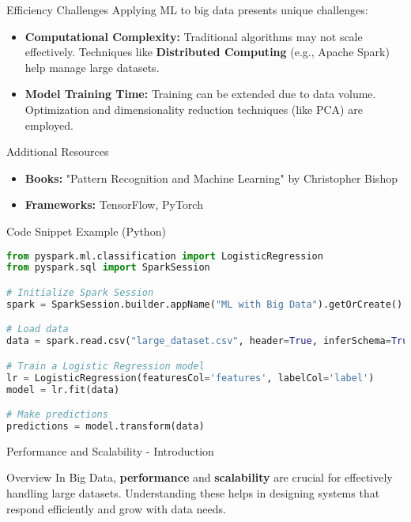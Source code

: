 \documentclass[aspectratio=169]{beamer}
\begin{document}
\begin{frame}[fragile]{Efficiency Challenges}
    Applying ML to big data presents unique challenges:
    \begin{itemize}
        \item \textbf{Computational Complexity:} Traditional algorithms may not scale effectively. Techniques like \textbf{Distributed Computing} (e.g., Apache Spark) help manage large datasets.
        \item \textbf{Model Training Time:} Training can be extended due to data volume. Optimization and dimensionality reduction techniques (like PCA) are employed.
    \end{itemize}
\end{frame}

\begin{frame}[fragile]{Additional Resources}
    \begin{itemize}
        \item \textbf{Books:} "Pattern Recognition and Machine Learning" by Christopher Bishop
        \item \textbf{Frameworks:} TensorFlow, PyTorch
    \end{itemize}
    
    \begin{block}{Code Snippet Example (Python)}
    \begin{lstlisting}[language=Python]
from pyspark.ml.classification import LogisticRegression
from pyspark.sql import SparkSession

# Initialize Spark Session
spark = SparkSession.builder.appName("ML with Big Data").getOrCreate()

# Load data
data = spark.read.csv("large_dataset.csv", header=True, inferSchema=True)

# Train a Logistic Regression model
lr = LogisticRegression(featuresCol='features', labelCol='label')
model = lr.fit(data)

# Make predictions
predictions = model.transform(data)
    \end{lstlisting}
    \end{block}
\end{frame}

\begin{frame}[fragile]{Performance and Scalability - Introduction}
  \begin{block}{Overview}
    In Big Data, \textbf{performance} and \textbf{scalability} are crucial for effectively handling large datasets. Understanding these helps in designing systems that respond efficiently and grow with data needs.
  \end{block}
\end{frame}
\end{document}
